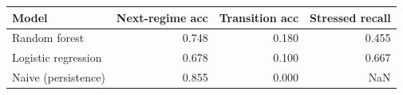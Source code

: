 \begin{tabular}{lrrr}
\toprule
Model & Next-regime acc & Transition acc & Stressed recall \\
\midrule
Random forest & 0.748 & 0.180 & 0.455 \\
Logistic regression & 0.678 & 0.100 & 0.667 \\
Naive (persistence) & 0.855 & 0.000 & NaN \\
\bottomrule
\end{tabular}

